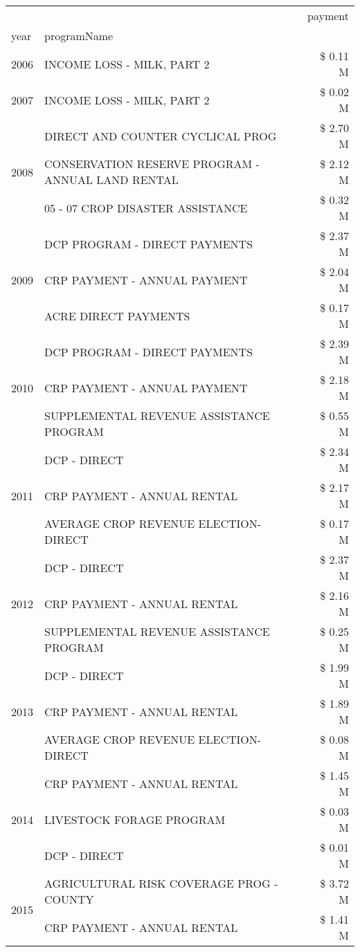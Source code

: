 \begin{tabular}{llr}
\toprule
 &  & payment \\
year & programName &  \\
\midrule
2006 & INCOME LOSS - MILK, PART 2 & \$ 0.11 M \\
\cline{1-3}
2007 & INCOME LOSS - MILK, PART 2 & \$ 0.02 M \\
\cline{1-3}
\multirow[t]{3}{*}{2008} & DIRECT AND COUNTER CYCLICAL PROG & \$ 2.70 M \\
 & CONSERVATION RESERVE PROGRAM - ANNUAL LAND RENTAL & \$ 2.12 M \\
 & 05 - 07 CROP DISASTER ASSISTANCE & \$ 0.32 M \\
\cline{1-3}
\multirow[t]{3}{*}{2009} & DCP PROGRAM - DIRECT PAYMENTS & \$ 2.37 M \\
 & CRP PAYMENT - ANNUAL PAYMENT & \$ 2.04 M \\
 & ACRE DIRECT PAYMENTS & \$ 0.17 M \\
\cline{1-3}
\multirow[t]{3}{*}{2010} & DCP PROGRAM - DIRECT PAYMENTS & \$ 2.39 M \\
 & CRP PAYMENT - ANNUAL PAYMENT & \$ 2.18 M \\
 & SUPPLEMENTAL REVENUE ASSISTANCE PROGRAM & \$ 0.55 M \\
\cline{1-3}
\multirow[t]{3}{*}{2011} & DCP - DIRECT & \$ 2.34 M \\
 & CRP PAYMENT - ANNUAL RENTAL & \$ 2.17 M \\
 & AVERAGE CROP REVENUE ELECTION-DIRECT & \$ 0.17 M \\
\cline{1-3}
\multirow[t]{3}{*}{2012} & DCP - DIRECT & \$ 2.37 M \\
 & CRP PAYMENT - ANNUAL RENTAL & \$ 2.16 M \\
 & SUPPLEMENTAL REVENUE ASSISTANCE PROGRAM & \$ 0.25 M \\
\cline{1-3}
\multirow[t]{3}{*}{2013} & DCP - DIRECT & \$ 1.99 M \\
 & CRP PAYMENT - ANNUAL RENTAL & \$ 1.89 M \\
 & AVERAGE CROP REVENUE ELECTION-DIRECT & \$ 0.08 M \\
\cline{1-3}
\multirow[t]{3}{*}{2014} & CRP PAYMENT - ANNUAL RENTAL & \$ 1.45 M \\
 & LIVESTOCK FORAGE PROGRAM & \$ 0.03 M \\
 & DCP - DIRECT & \$ 0.01 M \\
\cline{1-3}
\multirow[t]{3}{*}{2015} & AGRICULTURAL RISK COVERAGE PROG - COUNTY & \$ 3.72 M \\
 & CRP PAYMENT - ANNUAL RENTAL & \$ 1.41 M \\

\end{tabular}
